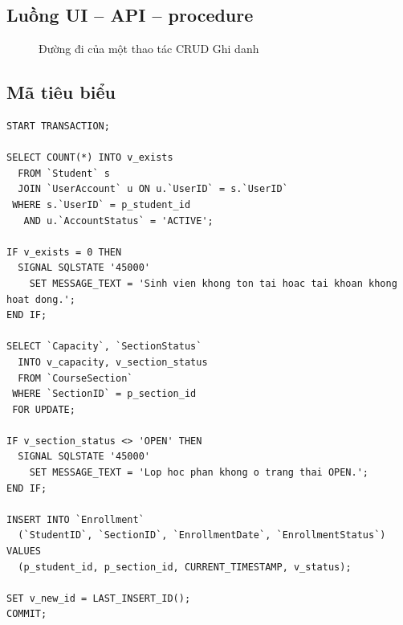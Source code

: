 \documentclass[a4paper,13pt]{extarticle}
\providecommand{\Tbl}[1]{\texttt{\detokenize{#1}}}
\begin{document}
\subsection{Luồng UI -- API -- procedure}

\begin{figure}[H]
\centering
{}
\caption{Đường đi của một thao tác CRUD Ghi danh}
\label{fig:crud-flow}
\end{figure}

\subsection{Mã tiêu biểu}

\begin{lstlisting}[style=sqlstyle,caption={Phần kiểm tra và transaction của \Tbl{sp_InsertEnrollment}},label={lst:insert-proc}]
START TRANSACTION;

SELECT COUNT(*) INTO v_exists
  FROM `Student` s
  JOIN `UserAccount` u ON u.`UserID` = s.`UserID`
 WHERE s.`UserID` = p_student_id
   AND u.`AccountStatus` = 'ACTIVE';

IF v_exists = 0 THEN
  SIGNAL SQLSTATE '45000'
    SET MESSAGE_TEXT = 'Sinh vien khong ton tai hoac tai khoan khong hoat dong.';
END IF;

SELECT `Capacity`, `SectionStatus`
  INTO v_capacity, v_section_status
  FROM `CourseSection`
 WHERE `SectionID` = p_section_id
 FOR UPDATE;

IF v_section_status <> 'OPEN' THEN
  SIGNAL SQLSTATE '45000'
    SET MESSAGE_TEXT = 'Lop hoc phan khong o trang thai OPEN.';
END IF;

INSERT INTO `Enrollment`
  (`StudentID`, `SectionID`, `EnrollmentDate`, `EnrollmentStatus`)
VALUES
  (p_student_id, p_section_id, CURRENT_TIMESTAMP, v_status);

SET v_new_id = LAST_INSERT_ID();
COMMIT;
\end{lstlisting}
\end{document}
